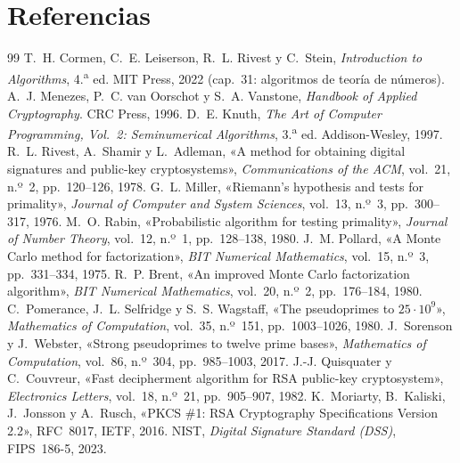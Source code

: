 \section{Referencias}
\label{sec:referencias}

\begingroup
\renewcommand{\section}[2]{}
\begin{thebibliography}{99}\small
{} T.~H. Cormen, C.~E. Leiserson, R.~L. Rivest y C.~Stein,
  \emph{Introduction to Algorithms}, 4.\textsuperscript{a} ed. MIT Press, 2022
  (cap.~31: algoritmos de teoría de números).
 A.~J. Menezes, P.~C. van Oorschot y S.~A. Vanstone,
  \emph{Handbook of Applied Cryptography}. CRC Press, 1996.
 D.~E. Knuth, \emph{The Art of Computer Programming, Vol.~2:
  Seminumerical Algorithms}, 3.\textsuperscript{a} ed. Addison-Wesley, 1997.
 R.~L. Rivest, A.~Shamir y L.~Adleman, «A method for obtaining
  digital signatures and public-key cryptosystems», \emph{Communications of the
  ACM}, vol.~21, n.º~2, pp.~120--126, 1978.
 G.~L. Miller, «Riemann's hypothesis and tests for
  primality», \emph{Journal of Computer and System Sciences}, vol.~13, n.º~3,
  pp.~300--317, 1976.
 M.~O. Rabin, «Probabilistic algorithm for testing
  primality», \emph{Journal of Number Theory}, vol.~12, n.º~1, pp.~128--138, 1980.
 J.~M. Pollard, «A Monte Carlo method for factorization»,
  \emph{BIT Numerical Mathematics}, vol.~15, n.º~3, pp.~331--334, 1975.
 R.~P. Brent, «An improved Monte Carlo factorization
  algorithm», \emph{BIT Numerical Mathematics}, vol.~20, n.º~2, pp.~176--184, 1980.
 C.~Pomerance, J.~L. Selfridge y S.~S. Wagstaff, «The
  pseudoprimes to $25\cdot10^9$», \emph{Mathematics of Computation}, vol.~35,
  n.º~151, pp.~1003--1026, 1980.
 J.~Sorenson y J.~Webster, «Strong pseudoprimes to twelve
  prime bases», \emph{Mathematics of Computation}, vol.~86, n.º~304,
  pp.~985--1003, 2017.
 J.-J. Quisquater y C.~Couvreur, «Fast decipherment algorithm
  for RSA public-key cryptosystem», \emph{Electronics Letters}, vol.~18, n.º~21,
  pp.~905--907, 1982.
 K.~Moriarty, B.~Kaliski, J.~Jonsson y A.~Rusch,
  «PKCS \#1: RSA Cryptography Specifications Version 2.2», RFC~8017, IETF, 2016.
 NIST, \emph{Digital Signature Standard (DSS)}, FIPS~186-5, 2023.

\end{thebibliography}
